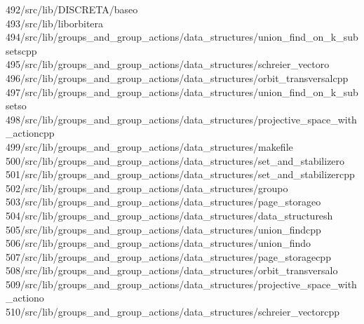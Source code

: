 \begin{tabbing}
492\>/src/lib/DISCRETA/baseo\\[0pt]
493\>/src/lib/liborbitera\\[0pt]
494\>/src/lib/groups\_and\_group\_actions/data\_structures/union\_find\_on\_k\_subsetscpp\\[0pt]
495\>/src/lib/groups\_and\_group\_actions/data\_structures/schreier\_vectoro\\[0pt]
496\>/src/lib/groups\_and\_group\_actions/data\_structures/orbit\_transversalcpp\\[0pt]
497\>/src/lib/groups\_and\_group\_actions/data\_structures/union\_find\_on\_k\_subsetso\\[0pt]
498\>/src/lib/groups\_and\_group\_actions/data\_structures/projective\_space\_with\_actioncpp\\[0pt]
499\>/src/lib/groups\_and\_group\_actions/data\_structures/makefile\\[0pt]
500\>/src/lib/groups\_and\_group\_actions/data\_structures/set\_and\_stabilizero\\[0pt]
501\>/src/lib/groups\_and\_group\_actions/data\_structures/set\_and\_stabilizercpp\\[0pt]
502\>/src/lib/groups\_and\_group\_actions/data\_structures/groupo\\[0pt]
503\>/src/lib/groups\_and\_group\_actions/data\_structures/page\_storageo\\[0pt]
504\>/src/lib/groups\_and\_group\_actions/data\_structures/data\_structuresh\\[0pt]
505\>/src/lib/groups\_and\_group\_actions/data\_structures/union\_findcpp\\[0pt]
506\>/src/lib/groups\_and\_group\_actions/data\_structures/union\_findo\\[0pt]
507\>/src/lib/groups\_and\_group\_actions/data\_structures/page\_storagecpp\\[0pt]
508\>/src/lib/groups\_and\_group\_actions/data\_structures/orbit\_transversalo\\[0pt]
509\>/src/lib/groups\_and\_group\_actions/data\_structures/projective\_space\_with\_actiono\\[0pt]
510\>/src/lib/groups\_and\_group\_actions/data\_structures/schreier\_vectorcpp\\[0pt]

\end{tabbing}
